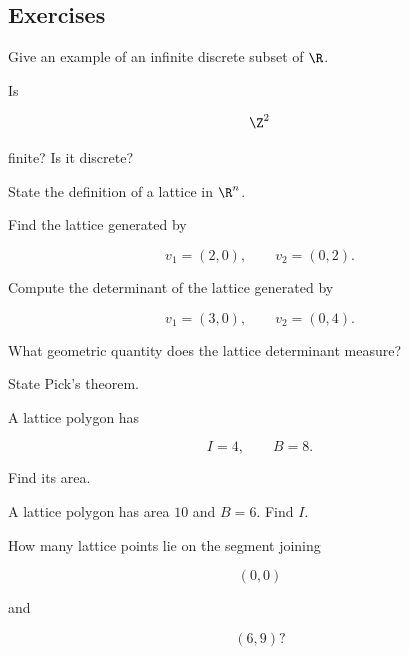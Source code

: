 \subsection{Exercises}
\label{subsec:discrete-geometry-exercises}

\begin{exercise}[1]
Give an example of an infinite discrete subset of \(\R\).
\end{exercise}

\begin{exercise}[1]
Is

\[
\Z^2
\]

finite? Is it discrete?
\end{exercise}

\begin{exercise}[1]
State the definition of a lattice in \(\R^n\).
\end{exercise}

\begin{exercise}[1]
Find the lattice generated by

\[
v_1=(2,0),
\qquad
v_2=(0,2).
\]
\end{exercise}

\begin{exercise}[1]
Compute the determinant of the lattice generated by

\[
v_1=(3,0),
\qquad
v_2=(0,4).
\]
\end{exercise}

\begin{exercise}[1]
What geometric quantity does the lattice determinant measure?
\end{exercise}

\begin{exercise}[1]
State Pick's theorem.
\end{exercise}

\begin{exercise}[1]
A lattice polygon has

\[
I=4,
\qquad
B=8.
\]

Find its area.
\end{exercise}

\begin{exercise}[1]
A lattice polygon has area \(10\) and \(B=6\). Find \(I\).
\end{exercise}

\begin{exercise}[1]
How many lattice points lie on the segment joining

\[
(0,0)
\]

and

\[
(6,9)?
\]
\end{exercise}

